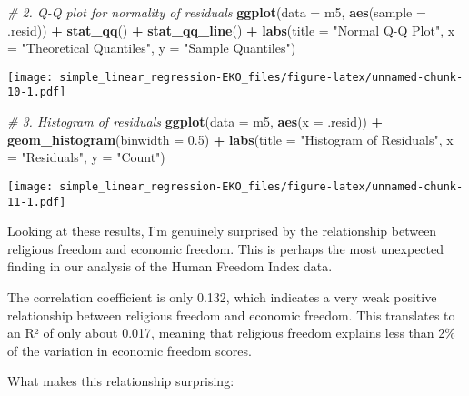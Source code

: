 \documentclass[
]{article}
\newenvironment{Shaded}{\begin{snugshade}}{\end{snugshade}}
\newcommand{\AttributeTok}[1]{\textcolor[rgb]{0.13,0.29,0.53}{#1}}
\newcommand{\CommentTok}[1]{\textcolor[rgb]{0.56,0.35,0.01}{\textit{#1}}}
\newcommand{\FloatTok}[1]{\textcolor[rgb]{0.00,0.00,0.81}{#1}}
\newcommand{\FunctionTok}[1]{\textcolor[rgb]{0.13,0.29,0.53}{\textbf{#1}}}
\newcommand{\NormalTok}[1]{#1}
\newcommand{\SpecialCharTok}[1]{\textcolor[rgb]{0.81,0.36,0.00}{\textbf{#1}}}
\newcommand{\StringTok}[1]{\textcolor[rgb]{0.31,0.60,0.02}{#1}}
\begin{document}
\begin{Shaded}
\begin{Highlighting}[]
\CommentTok{\# 2. Q{-}Q plot for normality of residuals}
\FunctionTok{ggplot}\NormalTok{(}\AttributeTok{data =}\NormalTok{ m5, }\FunctionTok{aes}\NormalTok{(}\AttributeTok{sample =}\NormalTok{ .resid)) }\SpecialCharTok{+}
  \FunctionTok{stat\_qq}\NormalTok{() }\SpecialCharTok{+}
  \FunctionTok{stat\_qq\_line}\NormalTok{() }\SpecialCharTok{+}
  \FunctionTok{labs}\NormalTok{(}\AttributeTok{title =} \StringTok{"Normal Q{-}Q Plot"}\NormalTok{,}
       \AttributeTok{x =} \StringTok{"Theoretical Quantiles"}\NormalTok{, }
       \AttributeTok{y =} \StringTok{"Sample Quantiles"}\NormalTok{)}
\end{Highlighting}
\end{Shaded}

\texttt{[image: simple\_linear\_regression-EKO\_files/figure-latex/unnamed-chunk-10-1.pdf]}

\begin{Shaded}
\begin{Highlighting}[]
\CommentTok{\# 3. Histogram of residuals}
\FunctionTok{ggplot}\NormalTok{(}\AttributeTok{data =}\NormalTok{ m5, }\FunctionTok{aes}\NormalTok{(}\AttributeTok{x =}\NormalTok{ .resid)) }\SpecialCharTok{+}
  \FunctionTok{geom\_histogram}\NormalTok{(}\AttributeTok{binwidth =} \FloatTok{0.5}\NormalTok{) }\SpecialCharTok{+}
  \FunctionTok{labs}\NormalTok{(}\AttributeTok{title =} \StringTok{"Histogram of Residuals"}\NormalTok{,}
       \AttributeTok{x =} \StringTok{"Residuals"}\NormalTok{, }
       \AttributeTok{y =} \StringTok{"Count"}\NormalTok{)}
\end{Highlighting}
\end{Shaded}

\texttt{[image: simple\_linear\_regression-EKO\_files/figure-latex/unnamed-chunk-11-1.pdf]}

Looking at these results, I'm genuinely surprised by the relationship
between religious freedom and economic freedom. This is perhaps the most
unexpected finding in our analysis of the Human Freedom Index data.

The correlation coefficient is only 0.132, which indicates a very weak
positive relationship between religious freedom and economic freedom.
This translates to an R² of only about 0.017, meaning that religious
freedom explains less than 2\% of the variation in economic freedom
scores.

What makes this relationship surprising:
\end{document}
